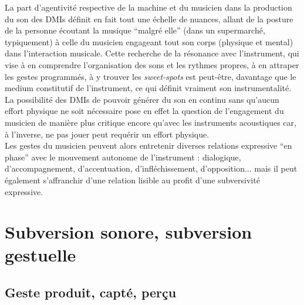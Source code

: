 \indent La part d'agentivité respective de la machine et du musicien dans la production du son des \glspl{DMI} définit en fait tout une échelle de nuances, allant de la posture de la personne écoutant la musique ``malgré elle'' (dans un supermarché, typiquement) à celle du musicien engageant tout son corps (physique et mental) dans l'interaction musicale. Cette recherche de la résonance avec l'instrument, qui vise à en comprendre l'organisation des sons et les rythmes propres, à en attraper les gestes programmés, à y trouver les \textit{sweet-spots} est peut-être, davantage que le medium constitutif de l'instrument, ce qui définit vraiment son instrumentalité. La possibilité des \glspl{DMI} de pouvoir générer du son en continu sans qu'aucun effort physique ne soit nécessaire pose en effet la question de l'engagement du musicien de manière plus critique encore qu'avec les instruments acoustiques car, à l'inverse, ne pas jouer peut requérir un effort physique.\\
\indent Les gestes du musicien peuvent alors entretenir diverses relations expressive ``en phase'' avec le mouvement autonome de l'instrument : dialogique, d'accompagnement, d'accentuation, d'infléchissement, d'opposition... mais il peut également s'affranchir d'une relation lisible au profit d'une subversivité expressive.




\section{Subversion sonore, subversion gestuelle}
\label{sec:gesture:subversion}

\subsection{Geste produit, capté, perçu}

